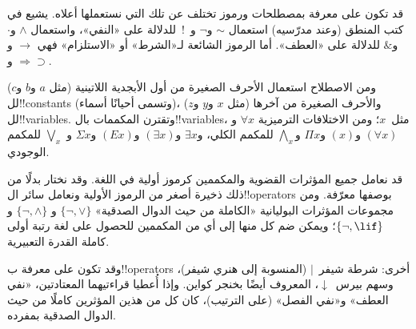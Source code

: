 \documentclass[../../../include/open-logic-section]{subfiles}
\begin{document}

\begin{intro}
قد تكون على معرفة بمصطلحات ورموز تختلف عن تلك التي نستعملها أعلاه. يشيع
في كتب المنطق (وعند مدرّسيه) استعمال $\sim$ و$\neg$ و~!\ للدلالة على
«النفي»، واستعمال $\wedge$ و$\cdot$ و$\&$ للدلالة على «العطف». أما
الرموز الشائعة لـ«الشرط» أو «الاستلزام» فهي $\rightarrow$
و$\Rightarrow$ و$\supset$.

ومن الاصطلاح استعمال الأحرف الصغيرة من أول الأبجدية اللاتينية (مثل
$a$ و$b$ و$c$) لل!!{constant}s (وتسمى أحيانًا أسماء)، والأحرف
الصغيرة من آخرها (مثل $x$ و$y$ و$z$) لل!!{variable}s. وتقترن
المكممات بال!!{variable}s، مثل~$x$؛ ومن الاختلافات الترميزية
$\forall x$ و$(\forall x)$ و$(x)$ و$\Pi x$ و$\bigwedge_x$ للمكمم
الكلي، و$\exists x$ و$(\exists x)$ و$(Ex)$ و$\Sigma x$ و
$\bigvee_x$ للمكمم الوجودي.
\end{intro}

\begin{explain}
قد نعامل جميع المؤثرات القضوية والمكممين كرموز أولية في اللغة. وقد
نختار بدلًا من ذلك ذخيرة أصغر من الرموز الأولية ونعامل سائر
ال!!{operator}s بوصفها معرّفة. ومن مجموعات المؤثرات البوليانية
«الكاملة من حيث الدوال الصدقية» $\{ \lnot, \lor \}$ و
$\{ \lnot, \land \}$ و$\{ \lnot, \lif\}$؛ ويمكن ضم كل منها إلى أي
من المكممين للحصول على لغة رتبة أولى كاملة القدرة التعبيرية.

وقد تكون على معرفة ب!!{operator}s أخرى: شرطة شيفر~$|$ (المنسوبة إلى
هنري شيفر)، وسهم بيرس~$\downarrow$، المعروف أيضًا بخنجر كواين. وإذا
أُعطيا قراءتيهما المعتادتين، «نفي العطف» و«نفي الفصل» (على الترتيب)،
كان كل من هذين المؤثرين كاملًا من حيث الدوال الصدقية بمفرده.
\end{explain}
\end{document}
